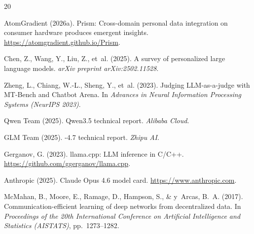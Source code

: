 \documentclass[11pt,a4paper]{article}
\begin{document}
\begin{thebibliography}{20}

AtomGradient (2026a).
\newblock Prism: Cross-domain personal data integration on consumer hardware
  produces emergent insights.
\newblock \url{https://atomgradient.github.io/Prism}.

Chen, Z., Wang, Y., Liu, Z., et~al. (2025).
\newblock A survey of personalized large language models.
\newblock \emph{arXiv preprint arXiv:2502.11528}.

Zheng, L., Chiang, W.-L., Sheng, Y., et~al. (2023).
\newblock Judging {LLM}-as-a-judge with {MT-Bench} and {Chatbot Arena}.
\newblock In \emph{Advances in Neural Information Processing Systems (NeurIPS
  2023)}.

Qwen Team (2025).
\newblock Qwen3.5 technical report.
\newblock \emph{Alibaba Cloud}.

GLM Team (2025).
-4.7 technical report.
\newblock \emph{Zhipu AI}.

Gerganov, G. (2023).
\newblock llama.cpp: {LLM} inference in {C/C++}.
\newblock \url{https://github.com/ggerganov/llama.cpp}.

Anthropic (2025).
\newblock Claude {Opus} 4.6 model card.
\newblock \url{https://www.anthropic.com}.

McMahan, B., Moore, E., Ramage, D., Hampson, S., \& y~Arcas, B.~A. (2017).
\newblock Communication-efficient learning of deep networks from decentralized
  data.
\newblock In \emph{Proceedings of the 20th International Conference on
  Artificial Intelligence and Statistics (AISTATS)}, pp.\ 1273--1282.

\end{thebibliography}
\end{document}
